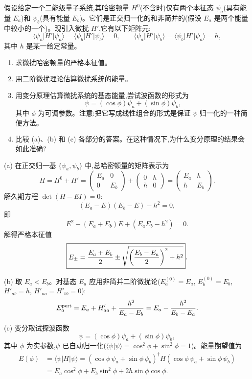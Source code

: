 \begin{question}
假设给定一个二能级量子系统,其哈密顿量 $H^0$(不含时)仅有两个本征态 $\psi_a$(具有能量 $E_a$)和 $\psi_b$(具有能量 $E_b$)。它们是正交归一化的和非简并的(假设 $E_a$ 是两个能量中较小的一个)。现引入微扰 $H'$,它有以下矩阵元:
\[
\langle\psi_a|H'|\psi_a\rangle=\langle\psi_b|H'|\psi_b\rangle=0,\qquad
\langle\psi_a|H'|\psi_b\rangle=\langle\psi_b|H'|\psi_a\rangle=h,
\]
其中 $h$ 是某一给定常量。
\begin{enumerate}
\item 求微扰哈密顿量的严格本征值。
\item 用二阶微扰理论估算微扰系统的能量。
\item 用变分原理估算微扰系统的基态能量,尝试波函数的形式为
\[
\psi=(\cos\phi)\psi_a+(\sin\phi)\psi_b,
\]
其中 $\phi$ 为可调参数。注意:把它写成线性组合的形式是保证 $\psi$ 归一化的一种简便方法。
\item 比较 (a)、(b) 和 (c) 各部分的答案。在这种情况下,为什么变分原理的结果会如此准确?
\end{enumerate}
\begin{solution}
(a) 在正交归一基 $\{\psi_a,\psi_b\}$ 中,总哈密顿量的矩阵表示为
\[
H=H^0+H'=\begin{pmatrix}E_a&0\\0&E_b\end{pmatrix}
+\begin{pmatrix}0&h\\h&0\end{pmatrix}
=\begin{pmatrix}E_a&h\\h&E_b\end{pmatrix}.
\]
解久期方程 $\det(H-EI)=0$:
\[
(E_a-E)(E_b-E)-h^2=0,
\]
即
\[
E^2-(E_a+E_b)E+(E_aE_b-h^2)=0.
\]
解得严格本征值
\[
\boxed{E_\pm={E_a+E_b\over2}\pm\sqrt{\left({E_b-E_a\over2}\right)^2+h^2}}.
\]

(b) 取 $E_a<E_b$。对基态 $E_a$ 应用非简并二阶微扰论($E_a^{(0)}=E_a$, $E_b^{(0)}=E_b$, $H'_{ab}=h$, $H'_{aa}=H'_{bb}=0$):
\[
E_a^{\rm pert}=E_a+{H'_{aa}}+{h^2\over E_a-E_b}
=E_a-{h^2\over E_b-E_a}.
\]

(c) 变分取试探波函数
\[
\psi=(\cos\phi)\psi_a+(\sin\phi)\psi_b,
\]
其中 $\phi$ 为实参数,$\psi$ 已自动归一化($\langle\psi|\psi\rangle=\cos^2\phi+\sin^2\phi=1$)。能量期望值为
\[
\begin{aligned}
E(\phi)&=\langle\psi|H|\psi\rangle
=(\cos\phi\,\psi_a+\sin\phi\,\psi_b)^\dagger H(\cos\phi\,\psi_a+\sin\phi\,\psi_b)\\
&=E_a\cos^2\phi+E_b\sin^2\phi+2h\sin\phi\cos\phi.
\end{aligned}
\]


\end{solution}
\end{question}
